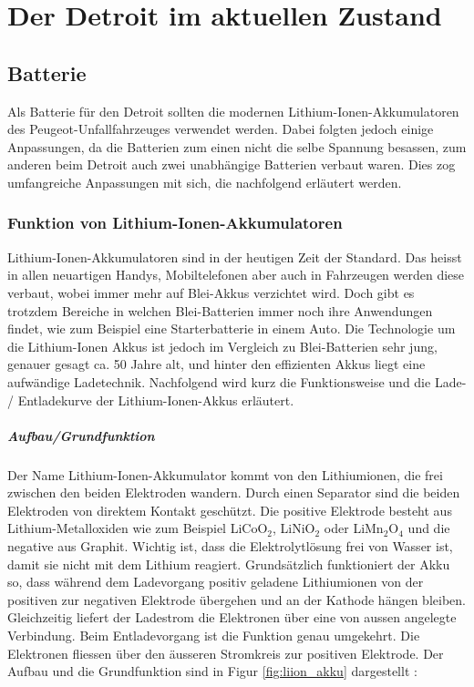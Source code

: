\chapter{Der Detroit im aktuellen Zustand}

\section{Batterie}
Als Batterie für den Detroit sollten die modernen Lithium-Ionen-Akkumulatoren des Peugeot-Unfallfahrzeuges verwendet werden. Dabei folgten jedoch einige Anpassungen, da die Batterien zum einen nicht die selbe Spannung besassen, zum anderen beim Detroit auch zwei unabhängige Batterien verbaut waren. Dies zog umfangreiche Anpassungen mit sich, die nachfolgend erläutert werden.

\subsection{Funktion von Lithium-Ionen-Akkumulatoren} \label{kap_liion}

Lithium-Ionen-Akkumulatoren sind in der heutigen Zeit der Standard. Das heisst in allen neuartigen Handys, Mobiltelefonen aber auch in Fahrzeugen werden diese verbaut, wobei immer mehr auf Blei-Akkus verzichtet wird. Doch gibt es trotzdem Bereiche in welchen Blei-Batterien immer noch ihre Anwendungen findet, wie zum Beispiel eine Starterbatterie in einem Auto. Die Technologie um die Lithium-Ionen Akkus ist jedoch im Vergleich zu Blei-Batterien sehr jung, genauer gesagt ca. 50 Jahre alt, und hinter den effizienten Akkus liegt eine aufwändige Ladetechnik. Nachfolgend wird kurz die Funktionsweise und die Lade- / Entladekurve der Lithium-Ionen-Akkus erläutert.

\paragraph{Aufbau/Grundfunktion}
Der Name Lithium-Ionen-Akkumulator kommt von den Lithiumionen, die frei zwischen den beiden Elektroden wandern. Durch einen Separator sind die beiden Elektroden von direktem Kontakt geschützt. Die positive Elektrode besteht aus Lithium-Metalloxiden wie zum Beispiel LiCoO$_2$, LiNiO$_2$ oder LiMn$_2$O$_4$ und die negative aus Graphit. Wichtig ist, dass die Elektrolytlösung frei von Wasser ist, damit sie nicht mit dem Lithium reagiert.
Grundsätzlich funktioniert der Akku so, dass während dem Ladevorgang positiv geladene Lithiumionen von der positiven zur negativen Elektrode übergehen und an der Kathode hängen bleiben. Gleichzeitig liefert der Ladestrom die Elektronen über eine von aussen angelegte Verbindung. Beim Entladevorgang ist die Funktion genau umgekehrt. Die Elektronen fliessen über den äusseren Stromkreis zur positiven Elektrode. Der Aufbau und die Grundfunktion sind in Figur \ref{fig:liion_akku} dargestellt \cite{liion_akku_aufbau_funktion2}:

